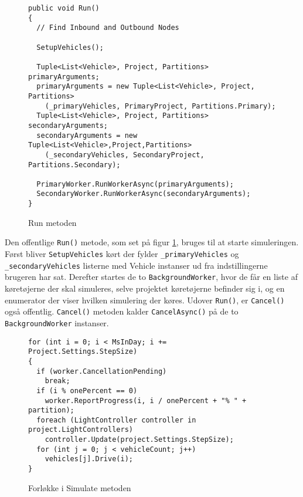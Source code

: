 \begin{figure}[H]
\begin{lstlisting}
public void Run()
{
  // Find Inbound and Outbound Nodes 

  SetupVehicles();

  Tuple<List<Vehicle>, Project, Partitions> primaryArguments;
  primaryArguments = new Tuple<List<Vehicle>, Project, Partitions>
    (_primaryVehicles, PrimaryProject, Partitions.Primary);
  Tuple<List<Vehicle>, Project, Partitions> secondaryArguments;
  secondaryArguments = new Tuple<List<Vehicle>,Project,Partitions>
    (_secondaryVehicles, SecondaryProject, Partitions.Secondary);

  PrimaryWorker.RunWorkerAsync(primaryArguments);
  SecondaryWorker.RunWorkerAsync(secondaryArguments);
}
\end{lstlisting}
\caption{Run metoden}\label{RunCode}
\end{figure}

Den offentlige \texttt{Run()} metode, som set på figur \ref{RunCode}, bruges til at starte simuleringen. Først bliver \texttt{SetupVehicles} kørt der fylder \texttt{\_primaryVehicles} og \texttt{\_secondaryVehicles} listerne med Vehicle instanser ud fra indstillingerne brugeren har sat. Derefter startes de to \texttt{BackgroundWorker}, hvor de får en liste af køretøjerne der skal simuleres, selve projektet køretøjerne befinder sig i, og en enumerator der viser hvilken simulering der køres. Udover \texttt{Run()}, er \texttt{Cancel()} også offentlig. \texttt{Cancel()} metoden kalder \texttt{CancelAsync()} på de to \texttt{BackgroundWorker} instanser. 

\begin{figure}[H]
\begin{lstlisting}
for (int i = 0; i < MsInDay; i += Project.Settings.StepSize)
{
  if (worker.CancellationPending)
    break;
  if (i % onePercent == 0)
    worker.ReportProgress(i, i / onePercent + "% " + partition);
  foreach (LightController controller in project.LightControllers)
    controller.Update(project.Settings.StepSize);
  for (int j = 0; j < vehicleCount; j++)
    vehicles[j].Drive(i);
}
\end{lstlisting}
\caption{Forløkke i Simulate metoden}\label{SimulateCode}
\end{figure}

